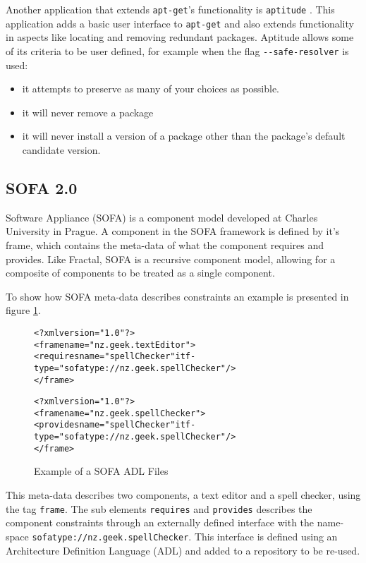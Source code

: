 Another application that extends \texttt{apt-get}'s functionality is \texttt{aptitude} \citep{Burrows2005}.
This application adds a basic user interface to \texttt{apt-get} and also extends functionality in aspects like locating and removing redundant packages.
Aptitude allows some of its criteria to be user defined, for example when the flag \verb+--safe-resolver+ is used:
\begin{itemize}
  \item it attempts to preserve as many of your choices as possible.
  \item it will never remove a package
  \item it will never install a version of a package other than the package's default candidate version.
\end{itemize}

\subsection{SOFA 2.0}
Software Appliance (SOFA) is a component model developed at Charles University in Prague.
A component in the SOFA framework is defined by it's frame, which contains the meta-data of what the component requires and provides.
Like Fractal, SOFA is a recursive component model, allowing for a composite of components to be treated as a single component.

To show how SOFA meta-data describes constraints an example is presented in figure \ref{SOFAmetadata}.

\begin{figure}[htp] 
\begin{center}
\begin{alltt}
<?xml version="1.0"?>
<frame name="nz.geek.textEditor">
  <requires name="spellChecker" itf-type="sofatype://nz.geek.spellChecker"/>
</frame>

<?xml version="1.0"?>
<frame name="nz.geek.spellChecker">
  <provides name="spellChecker" itf-type="sofatype://nz.geek.spellChecker"/>
</frame>
\end{alltt}
  \caption[SOFA ADL files]{Example of a SOFA ADL Files}
  \label{SOFAmetadata}
\end{center}
\end{figure}

This meta-data describes two components, a text editor and a spell checker, using the tag \texttt{frame}.
The sub elements \texttt{requires} and \texttt{provides} describes the component constraints through an externally defined interface with the name-space \texttt{sofatype://nz.geek.spellChecker}.
This interface is defined using an Architecture Definition Language (ADL) and added to a repository to be re-used. 


